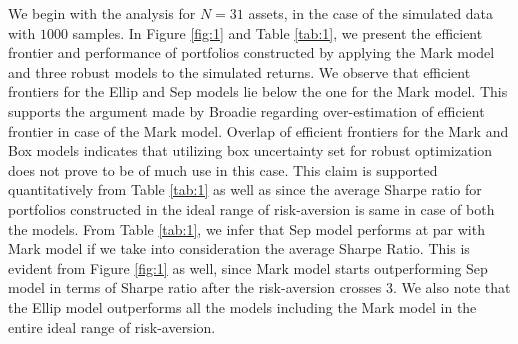 We begin with the analysis for $N=31$ assets, in the case of the simulated data with $1000$ samples. In Figure \ref{fig:1} and Table \ref{tab:1}, we present the efficient frontier and performance of portfolios constructed by applying the Mark model and three robust models to the simulated returns. We observe that efficient frontiers for the Ellip and Sep models lie below the one for the Mark model. This supports the argument made by Broadie \cite{Broadie} regarding over-estimation of efficient frontier in case of the Mark model. Overlap of efficient frontiers for the Mark and Box models indicates that utilizing box uncertainty set for robust optimization does not prove to be of much use in this case. This claim is supported quantitatively from Table \ref{tab:1} as well as since the average Sharpe ratio for portfolios constructed in the ideal range of risk-aversion is same in case of both the models. From Table \ref{tab:1}, we infer that Sep model performs at par with Mark model if we take into consideration the average Sharpe Ratio. This is evident from Figure \ref{fig:1} as well, since Mark model starts outperforming Sep model in terms of Sharpe ratio after the risk-aversion crosses 3. We also note that the Ellip model outperforms all the models including the Mark model in the entire ideal range of risk-aversion.


